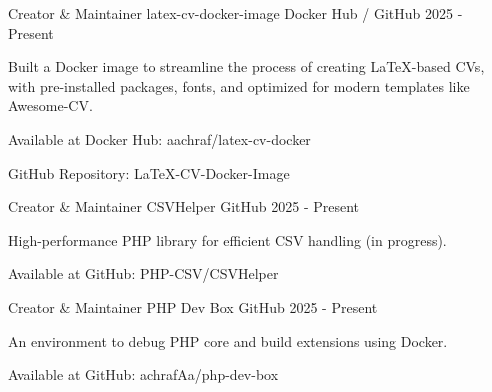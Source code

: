 \newpage


\begin{cventries}

  \cventry
  {Creator \& Maintainer} %
  {latex-cv-docker-image} %
  {Docker Hub / GitHub} %
  {2025 - Present} %
  {
    \begin{cvitems} %
      \item {Built a Docker image to streamline the process of creating LaTeX-based CVs, with pre-installed packages, fonts, and optimized for modern templates like Awesome-CV.}
      \item {Available at Docker Hub: aachraf/latex-cv-docker}
      \item {GitHub Repository: LaTeX-CV-Docker-Image}
    \end{cvitems}
  }

\cventry
{Creator \& Maintainer} %
{CSVHelper} %
{GitHub} %
{2025 - Present} %
{
  \begin{cvitems} %
    \item {High-performance PHP library for efficient CSV handling (in progress).}
    \item {Available at GitHub: PHP-CSV/CSVHelper}
  \end{cvitems}
}

\cventry
{Creator \& Maintainer} %
{PHP Dev Box} %
{GitHub} %
{2025 - Present} %
{
  \begin{cvitems} %
    \item {An environment to debug PHP core and build extensions using Docker.}
    \item {Available at GitHub: achrafAa/php-dev-box}
  \end{cvitems}
}

\end{cventries} 